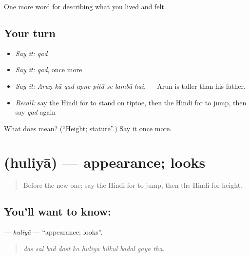 \begin{grammarlens}[title={What you've built}]
One more word for describing what you lived and felt.
\end{grammarlens}

\subsection*{Your turn}
\begin{itemize}
\raggedright
  \item \emph{Say it:} \emph{qad}
  \item \emph{Say it:} \emph{qad}, once more
  \item \emph{Say it:} \emph{Aruṇ kā qad apne pitā se lambā hai.} — Arun is taller than his father.
  \item \emph{Recall:} say the Hindi for to stand on tiptoe, then the Hindi for to jump, then say \emph{qad} again
\end{itemize}

\begin{tcolorbox}[breakable,colback=teal!4,colframe=teal!35!black,title={Before you move on}]
What does  mean? (\textquotedblleft{}Height; stature\textquotedblright{}.) Say it once more.
\end{tcolorbox}
\section[\texorpdfstring{\hi{हुलिया} (huliyā)}{हुलिया (huliyā)}]{ (huliyā) — appearance; looks}

\label{lesson:HI-C482-huliya}



\begin{quote}
Before the new one: say the Hindi for to jump, then the Hindi for height.
\end{quote}

\subsection*{You'll want to know: }
\textbf{} — \emph{huliyā} — \textquotedblleft{}appearance; looks\textquotedblright{}.

\begin{quote}
         
\end{quote}

\begin{quote}
\emph{das sāl bād dost kā huliyā bilkul badal gayā thā.}
\end{quote}

